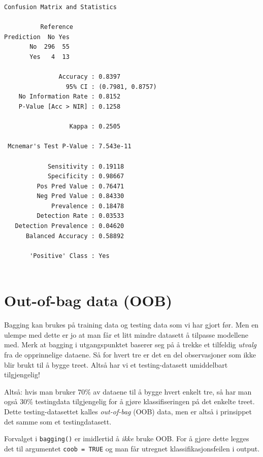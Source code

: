 \documentclass[
  letterpaper,
  DIV=11,
  numbers=noendperiod]{scrreprt}
\begin{document}
\begin{verbatim}
Confusion Matrix and Statistics

          Reference
Prediction  No Yes
       No  296  55
       Yes   4  13
                                          
               Accuracy : 0.8397          
                 95% CI : (0.7981, 0.8757)
    No Information Rate : 0.8152          
    P-Value [Acc > NIR] : 0.1258          
                                          
                  Kappa : 0.2505          
                                          
 Mcnemar's Test P-Value : 7.543e-11       
                                          
            Sensitivity : 0.19118         
            Specificity : 0.98667         
         Pos Pred Value : 0.76471         
         Neg Pred Value : 0.84330         
             Prevalence : 0.18478         
         Detection Rate : 0.03533         
   Detection Prevalence : 0.04620         
      Balanced Accuracy : 0.58892         
                                          
       'Positive' Class : Yes             
                                          
\end{verbatim}

\section{Out-of-bag data (OOB)}\label{out-of-bag-data-oob}

Bagging kan brukes på training data og testing data som vi har gjort
før. Men en ulempe med dette er jo at man får et litt mindre datasett å
tilpasse modellene med. Merk at bagging i utgangspunktet baserer seg på
å trekke et tilfeldig \emph{utvalg} fra de opprinnelige dataene. Så for
hvert tre er det en del observasjoner som ikke blir brukt til å bygge
treet. Altså har vi et testing-datasett umiddelbart tilgjengelig!

Altså: hvis man bruker 70\% av dataene til å bygge hvert enkelt tre, så
har man også 30\% testingdata tilgjengelig for å gjøre klassifiseringen
på det enkelte treet. Dette testing-datasettet kalles \emph{out-of-bag}
(OOB) data, men er altså i prinsippet det samme som et testingdatasett.

Forvalget i \texttt{bagging()} er imidlertid å \emph{ikke} bruke OOB.
For å gjøre dette legges det til argumentet \texttt{coob\ =\ TRUE} og
man får utregnet klassifikasjonsfeilen i output.
\end{document}
